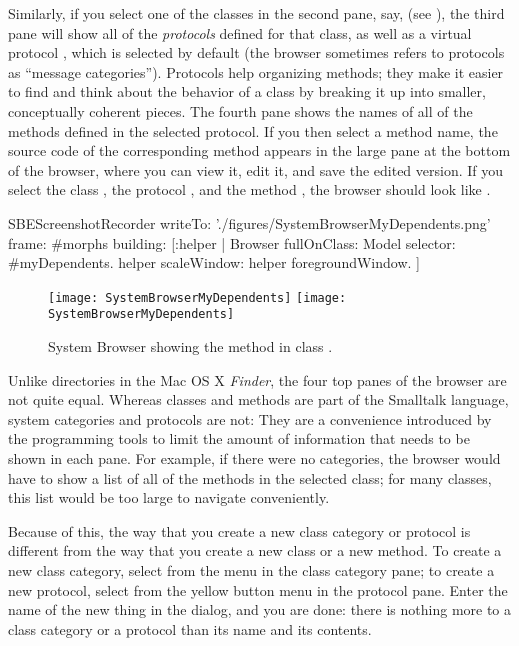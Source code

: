 \documentclass[a4paper,10pt,twoside]{book}
\begin{document}
Similarly, if you select one of the classes in the second pane, say,  (see ), the third pane will show all of the \emph{protocols} defined for that class, as well as a virtual protocol , which is selected by default (the browser sometimes refers to protocols as ``message categories'').
Protocols help organizing methods; they make it easier to find and think about the behavior of a class by breaking it up into smaller, conceptually coherent pieces.
The fourth pane shows the names of all of the methods defined in the selected protocol.
If you then select a method name, the source code of the corresponding method appears in the large pane at the bottom of the browser, where you can view it, edit it, and save the edited version.
If you select the class , the protocol , and the method , the browser should look like .

\begin{ExecuteSmalltalkScript}
SBEScreenshotRecorder writeTo: './figures/SystemBrowserMyDependents.png' frame: #morphs building: [:helper |
	Browser fullOnClass: Model selector: #myDependents.
	helper scaleWindow: helper foregroundWindow.
]
\end{ExecuteSmalltalkScript}
\begin{figure}[htbp]
   \centering
   \ifluluelse
	   {\texttt{[image: SystemBrowserMyDependents]}}
	   {\texttt{[image: SystemBrowserMyDependents]}}
   \caption{System Browser showing the  method in class .
   \label{fig:SystemBrowserMyDependents}}
\end{figure}

Unlike directories in the Mac OS X \emph{Finder}, the four top panes of the browser are not quite equal.
Whereas classes and methods are part of the Smalltalk language, system categories and protocols are not:
They are a convenience introduced by the programming tools to limit the amount of information that needs to be shown in each pane.
For example, if there were no categories, the browser would have to show a list of all of the methods in the selected class; for many classes, this list would be too large to navigate conveniently.

Because of this, the way that you create a new class category or protocol is different from the way that you create a new class or a new method.
To create a new class category, select  from the  menu in the class category pane; to create a new protocol, select  from the yellow button menu in the protocol pane.
Enter the name of the new thing in the dialog, and you are done: there is nothing more to a class category or a protocol than its name and its contents.
\end{document}
